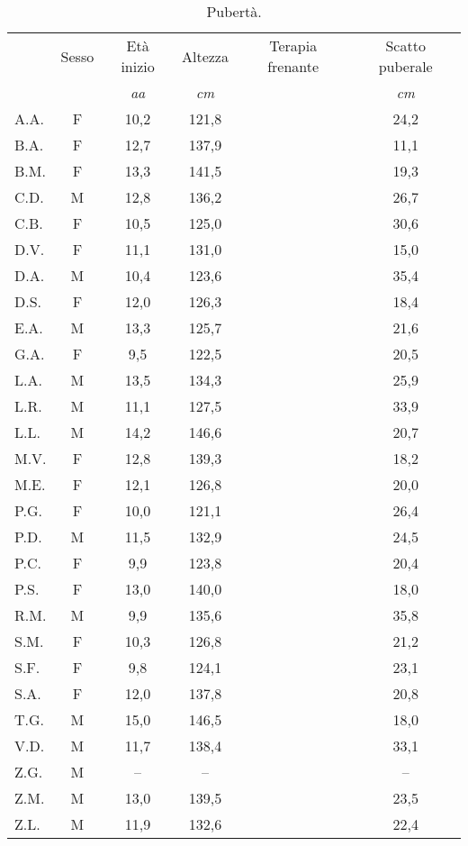 \begin{table}[!h]
\begin{center}
\begin{tabular}{lccccc}
\toprule
 & Sesso 	& \multicolumn{1}{c}{Età inizio}	& Altezza	& Terapia frenante & Scatto puberale \\
 & &  \emph{aa} 	& \emph{cm}	& & \emph{cm}		\\
\midrule
A.A.	& F & 10,2 		& 121,8  		& \checkmark & 24,2 \\
B.A.	& F & 12,7 		& 137,9   		&            & 11,1 \\
B.M.	& F & 13,3 		& 141,5   		&            & 19,3 \\
C.D.	& M & 12,8 		& 136,2   		&            & 26,7 \\
C.B.	& F & 10,5 		& 125,0   		& \checkmark & 30,6 \\
D.V.	& F & 11,1 		& 131,0   		&            & 15,0 \\
D.A.	& M & 10,4 		& 123,6   		& \checkmark & 35,4 \\
D.S.	& F & 12,0 		& 126,3   		&            & 18,4 \\
E.A.	& M & 13,3		& 125,7   		&            & 21,6 \\
G.A.	& F &  9,5  		& 122,5   		&            & 20,5 \\
L.A.	& M & 13,5 		& 134,3   		&            & 25,9 \\
L.R.	& M & 11,1 		& 127,5   		&            & 33,9 \\
L.L.	& M & 14,2 		& 146,6   		&            & 20,7 \\
M.V.	& F & 12,8 		& 139,3   		&            & 18,2 \\
M.E.	& F & 12,1 		& 126,8   		&            & 20,0 \\
P.G.	& F & 10,0 		& 121,1   		& \checkmark & 26,4 \\
P.D.	& M & 11,5 		& 132,9   		&            & 24,5 \\
P.C.	& F &  9,9  		& 123,8   		& \checkmark & 20,4 \\
P.S.	& F & 13,0 		& 140,0   		&            & 18,0 \\
R.M.	& M &  9,9  		& 135,6   		& \checkmark & 35,8 \\
S.M.	& F & 10,3 		& 126,8   		& \checkmark & 21,2 \\
S.F.	& F &  9,8  		& 124,1   		&            & 23,1 \\
S.A.	& F & 12,0 		& 137,8   		&            & 20,8 \\
T.G.    & M & 15,0      	& 146,5         	&            & 18,0 \\ 
V.D.	& M & 11,7 		& 138,4   		&            & 33,1 \\
Z.G.	& M &  --    		& --   			&            & --   \\
Z.M.	& M & 13,0 		& 139,5   		&            & 23,5 \\
Z.L.	& M & 11,9 		& 132,6   		&            & 22,4 \\
\bottomrule
\end{tabular}
\end{center}
\caption{Pubertà.}
\label{tab:Puberta}
\end{table}

